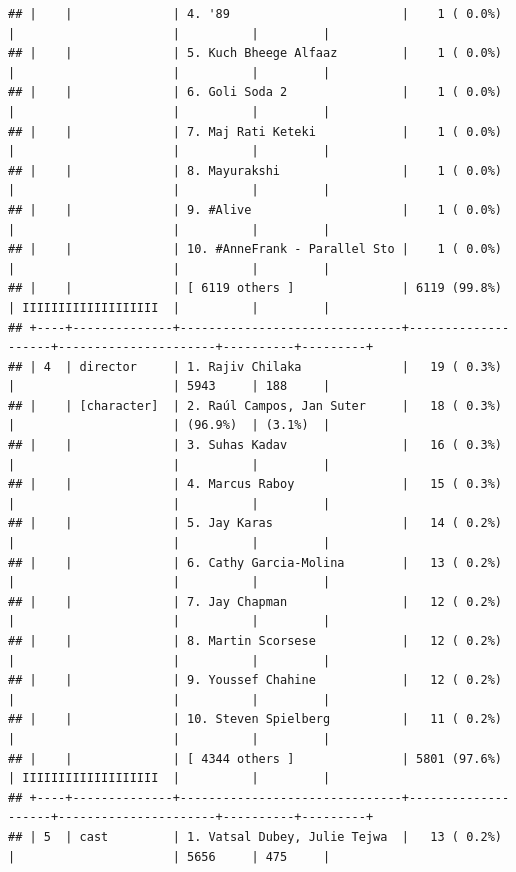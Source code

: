 \documentclass[11pt,preprint]{elsarticle}
\numberwithin{equation}{section}
\numberwithin{figure}{section}
\numberwithin{table}{section}
\begin{document}
\begin{verbatim}
## |    |              | 4. '89                        |    1 ( 0.0%)       |                      |          |         |
## |    |              | 5. ​​Kuch Bheege Alfaaz         |    1 ( 0.0%)       |                      |          |         |
## |    |              | 6. ​Goli Soda 2                |    1 ( 0.0%)       |                      |          |         |
## |    |              | 7. ​Maj Rati ​​Keteki            |    1 ( 0.0%)       |                      |          |         |
## |    |              | 8. ​Mayurakshi                 |    1 ( 0.0%)       |                      |          |         |
## |    |              | 9. #Alive                     |    1 ( 0.0%)       |                      |          |         |
## |    |              | 10. #AnneFrank - Parallel Sto |    1 ( 0.0%)       |                      |          |         |
## |    |              | [ 6119 others ]               | 6119 (99.8%)       | IIIIIIIIIIIIIIIIIII  |          |         |
## +----+--------------+-------------------------------+--------------------+----------------------+----------+---------+
## | 4  | director     | 1. Rajiv Chilaka              |   19 ( 0.3%)       |                      | 5943     | 188     |
## |    | [character]  | 2. Raúl Campos, Jan Suter     |   18 ( 0.3%)       |                      | (96.9%)  | (3.1%)  |
## |    |              | 3. Suhas Kadav                |   16 ( 0.3%)       |                      |          |         |
## |    |              | 4. Marcus Raboy               |   15 ( 0.3%)       |                      |          |         |
## |    |              | 5. Jay Karas                  |   14 ( 0.2%)       |                      |          |         |
## |    |              | 6. Cathy Garcia-Molina        |   13 ( 0.2%)       |                      |          |         |
## |    |              | 7. Jay Chapman                |   12 ( 0.2%)       |                      |          |         |
## |    |              | 8. Martin Scorsese            |   12 ( 0.2%)       |                      |          |         |
## |    |              | 9. Youssef Chahine            |   12 ( 0.2%)       |                      |          |         |
## |    |              | 10. Steven Spielberg          |   11 ( 0.2%)       |                      |          |         |
## |    |              | [ 4344 others ]               | 5801 (97.6%)       | IIIIIIIIIIIIIIIIIII  |          |         |
## +----+--------------+-------------------------------+--------------------+----------------------+----------+---------+
## | 5  | cast         | 1. Vatsal Dubey, Julie Tejwa  |   13 ( 0.2%)       |                      | 5656     | 475     |

\end{verbatim}
\end{document}
